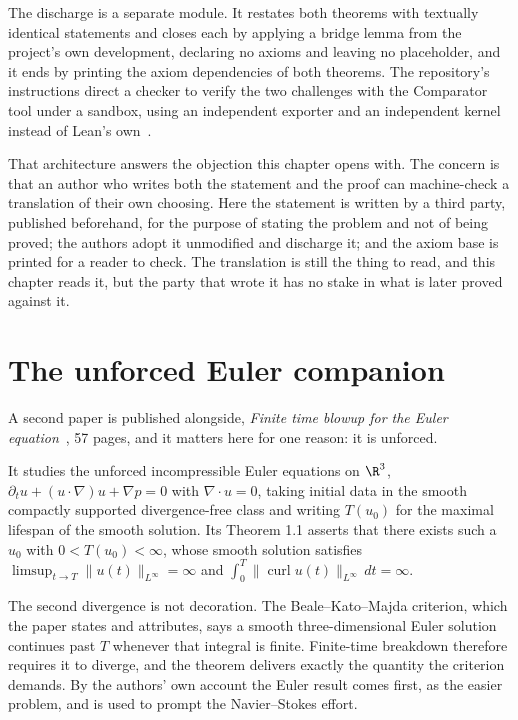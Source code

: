 The discharge is a separate module. It restates both theorems with textually identical statements
and closes each by applying a bridge lemma from the project's own development, declaring no axioms
and leaving no placeholder, and it ends by printing the axiom dependencies of both theorems. The
repository's instructions direct a checker to verify the two challenges with the Comparator tool
under a sandbox, using an independent exporter and an independent kernel instead of Lean's
own~\cite{src:OpenAI-2026-Lean}.

That architecture answers the objection this chapter opens with. The concern is that an author who
writes both the statement and the proof can machine-check a translation of their own choosing. Here
the statement is written by a third party, published beforehand, for the purpose of stating the
problem and not of being proved; the authors adopt it unmodified and discharge it; and the axiom base
is printed for a reader to check. The translation is still the thing to read, and this chapter reads
it, but the party that wrote it has no stake in what is later proved against it.

\section{The unforced Euler companion}

A second paper is published alongside, \emph{Finite time blowup for the Euler
equation}~\cite{src:OpenAI-2026-Euler}, 57 pages, and it matters here for one reason: it is unforced.

It studies the unforced incompressible Euler equations on $\R^3$, $\partial_t u + (u\cdot\nabla)u +
\nabla p = 0$ with $\nabla\cdot u = 0$, taking initial data in the smooth compactly supported
divergence-free class and writing $T(u_0)$ for the maximal lifespan of the smooth solution. Its
Theorem 1.1 asserts that there exists such a $u_0$ with $0 < T(u_0) < \infty$, whose smooth
solution satisfies $\limsup_{t\to T}\|u(t)\|_{L^\infty} = \infty$ and
$\int_0^T \|\operatorname{curl} u(t)\|_{L^\infty}\,dt = \infty$.

The second divergence is not decoration. The Beale--Kato--Majda criterion, which the paper states
and attributes, says a smooth three-dimensional Euler solution continues past $T$ whenever that
integral is finite. Finite-time breakdown therefore requires it to diverge, and the theorem
delivers exactly the quantity the criterion demands. By the authors' own account the Euler result
comes first, as the easier problem, and is used to prompt the Navier--Stokes effort.

